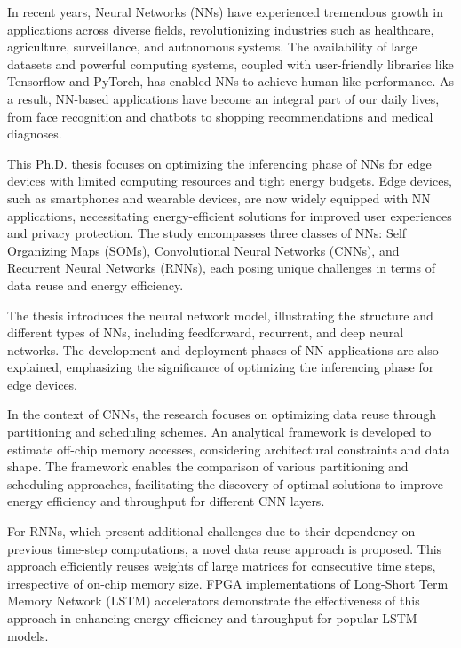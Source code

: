 \begin{comment}
In conclusion, this thesis contributes to optimizing NN accelerators on parallel architectures, addressing energy efficiency and throughput challenges. The analytical framework and data-reuse schemes provide valuable insights for designing energy-efficient NN inferencing on edge devices.
\end{comment}
In recent years, Neural Networks (NNs) have experienced tremendous growth in applications across diverse fields, revolutionizing industries such as healthcare, agriculture, surveillance, and autonomous systems. The availability of large datasets and powerful computing systems, coupled with user-friendly libraries like Tensorflow and PyTorch, has enabled NNs to achieve human-like performance. As a result, NN-based applications have become an integral part of our daily lives, from face recognition and chatbots to shopping recommendations and medical diagnoses.

This Ph.D. thesis focuses on optimizing the inferencing phase of NNs for edge devices with limited computing resources and tight energy budgets. Edge devices, such as smartphones and wearable devices, are now widely equipped with NN applications, necessitating energy-efficient solutions for improved user experiences and privacy protection. The study encompasses three classes of NNs: Self Organizing Maps (SOMs), Convolutional Neural Networks (CNNs), and Recurrent Neural Networks (RNNs), each posing unique challenges in terms of data reuse and energy efficiency.

The thesis introduces the neural network model, illustrating the structure and different types of NNs, including feedforward, recurrent, and deep neural networks. The development and deployment phases of NN applications are also explained, emphasizing the significance of optimizing the inferencing phase for edge devices.

In the context of CNNs, the research focuses on optimizing data reuse through partitioning and scheduling schemes. An analytical framework is developed to estimate off-chip memory accesses, considering architectural constraints and data shape. The framework enables the comparison of various partitioning and scheduling approaches, facilitating the discovery of optimal solutions to improve energy efficiency and throughput for different CNN layers.

For RNNs, which present additional challenges due to their dependency on previous time-step computations, a novel data reuse approach is proposed. This approach efficiently reuses weights of large matrices for consecutive time steps, irrespective of on-chip memory size. FPGA implementations of Long-Short Term Memory Network (LSTM) accelerators demonstrate the effectiveness of this approach in enhancing energy efficiency and throughput for popular LSTM models.

